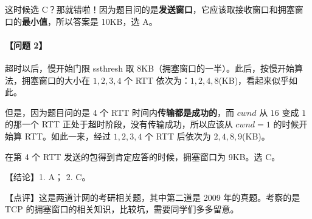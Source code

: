 \documentclass[UTF8]{ctexart}
\begin{document}
这时候选 C？那就错啦！因为题目问的是\textbf{发送窗口}，它应该取接收窗口和拥塞窗口的\textbf{最小值}，所以答案是 10KB，选 A。

\BgThispage
\paragraph{【问题 2】}
超时以后，慢开始门限 ssthresh 取 8KB（拥塞窗口的一半）。此后，按慢开始算法，拥塞窗口的大小在 $1,2,3,4$ 个 RTT 依次为：$1,2,4,8$(KB)，看起来似乎如此。

但是，因为题目问的是 4 个 RTT 时间内\textbf{传输都是成功的}，而 $cwnd$ 从 $16$ 变成 $1$ 的那一个 RTT 正处于超时阶段，没有传输成功，所以应该从 $cwnd=1$ 的时候开始算 RTT。如此一来，经过 $1,2,3,4$ 个 RTT 后依次为 $2,4,8,9$(KB)。

在第 4 个 RTT 发送的包得到肯定应答的时候，拥塞窗口为 9KB。选 C。


\vspace{1em}
{\color{cyan!80!black}
【结论】1. A； 2. C。

【点评】这是两道计网的考研相关题，其中第二道是 2009 年的真题。考察的是 TCP 的拥塞窗口的相关知识，比较坑，需要同学们多多留意。
}
\end{document}
